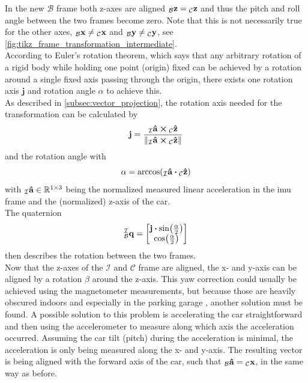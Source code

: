 In the new $\mathcal{B}$ frame both z-axes are aligned $\vincs{z}{b} = \vincs{z}{c}$ and thus the pitch and roll angle between the two frames become zero.
Note that this is not necessarily true for the other axes, $\vincs{x}{b}\neq\vincs{x}{c}$ and $\vincs{y}{b}\neq\vincs{y}{c}$, see \cref{fig:tikz_frame_transformation_intermediate}.\\
According to Euler's rotation theorem, which says that any arbitrary rotation of a rigid body while holding one point (origin) fixed can be achieved by a rotation around a single fixed axis passing through the origin, there exists one rotation axis $\mathbf{j}$ and rotation angle $\alpha$ to achieve this.\\
As described in \cref{subsec:vector_projection}, the rotation axis needed for the transformation can be calculated by
\begin{equation}
	\vb{j} = \frac{\vincs{\vu{a}}{i} \cp \vincs{\vu{z}}{c}}{\norm{\vincs{\vu{a}}{i} \cp \vincs{\vu{z}}{c}}}
\end{equation}
and the rotation angle with
\begin{equation}
	\alpha = \arccos(\vincs{\vu{a}}{i}\vdot \vincs{\vu{z}}{c})
\end{equation}
with $\vincs{\vu{a}}{i} \in \mathbb{R}^{1\times3}$ being the normalized measured linear acceleration in the \gls{imu} frame and  the (normalized) z-axis of the car.\\
The quaternion
\begin{equation}
	\qtf{i}{b} =
	\begin{bmatrix}
		\vb{j}\vdot\sin(\frac{\alpha}{2}) \\
		\cos(\frac{\alpha}{2})
	\end{bmatrix}
\end{equation}
then describes the rotation between the two frames.\\
Now that the z-axes of the $\mathcal{I}$ and $\mathcal{C}$ frame are aligned, the x- and y-axis can be aligned by a rotation $\beta$ around the z-axis.
This yaw correction could usually be achieved using the magnetometer measurements, but because those are heavily obscured indoors and especially in the parking garage \cite{Li2012}, another solution must be found.
A possible solution to this problem is accelerating the car straightforward and then using the accelerometer to measure along which axis the acceleration occurred.
Assuming the car tilt (pitch) during the acceleration is minimal, the acceleration is only being measured along the x- and y-axis.
The resulting vector is being aligned with the forward axis of the car, such that $\vincs{\hat{a}}{b} = \vincs{x}{c}$, in the same way as before.
